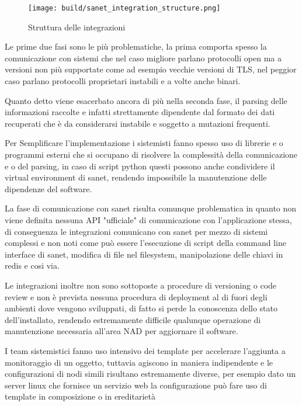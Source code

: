 \begin{figure}[H]
    \centering
    \texttt{[image: build/sanet\_integration\_structure.png]}
    \caption{Struttura delle integrazioni}
    \label{fig:enter-label}
\end{figure}

Le prime due fasi sono le più problematiche, la prima comporta spesso la comunicazione con sistemi che nel caso migliore parlano protocolli open ma a versioni non più supportate come ad esempio vecchie versioni di TLS, nel peggior caso parlano protocolli proprietari instabili e a volte anche binari.

Quanto detto viene esacerbato ancora di più nella seconda fase, il parsing delle informazioni raccolte e infatti strettamente dipendente dal formato dei dati recuperati che è da considerarsi instabile e soggetto a mutazioni frequenti.

Per Semplificare l'implementazione i sistemisti fanno spesso uso di librerie e o programmi esterni che si occupano di risolvere la complessità della comunicazione e o del parsing, in caso di script python questi possono anche condividere il virtual environment di sanet, rendendo impossibile la manutenzione delle dipendenze del software.

La fase di comunicazione con sanet risulta comunque problematica in quanto non viene definita nessuna API "ufficiale" di comunicazione con l'applicazione stessa, di conseguenza le integrazioni comunicano con sanet per mezzo di sistemi complessi e non noti come può essere l'esecuzione di script della command line interface di sanet, modifica di file nel filesystem, manipolazione delle chiavi in redis e cosi via.

Le integrazioni inoltre non sono sottoposte a procedure di versioning o code review e non è prevista nessuna procedura di deployment al di fuori degli ambienti dove vengono sviluppati, di fatto si perde la conoscenza dello stato dell'installato, rendendo estremamente difficile qualunque operazione di manutenzione necessaria all'area NAD per aggiornare il software.

I team sistemistici fanno uso intensivo dei template per accelerare l'aggiunta a monitoraggio di un oggetto, tuttavia agiscono in maniera indipendente e le configurazioni di nodi simili risultano estremamente diverse, per esempio dato un server linux che fornisce un servizio web la configurazione può fare uso di template in composizione o in ereditarietà

